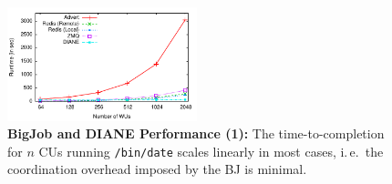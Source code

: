 \documentclass[conference,final]{IEEEtran}
\makeatletter
\def\reduwave{\bgroup \markoverwith{\lower3.5\p@\hbox{\sixly \textcolor{red}{\char58}}}\ULon}
\newcommand{\jwave}[1]{ {\reduwave{#1}}}
\newcommand{\jhanote}[1]{ {\textcolor{red} { ***shantenu: #1 }}}
\newcommand{\alnote}[1]{ {\textcolor{blue} { ***andrel: #1 }}}
\newcommand{\jwave}[1]{#1}
\newcommand{\alnote}[1]{}
\newcommand{\jhanote}[1]{}
\newcommand{\cu}{CU\xspace}
\newcommand{\cus}{CUs\xspace}
\newcommand{\upp}{\vspace*{-0.5em}}
\makeatother
\begin{document}






\begin{figure}[htbp] \centering
\includegraphics[width=0.49\textwidth]{perf/bigjob-varying-wus-alamo.pdf}
\caption{\textbf{BigJob and DIANE Performance (1):} The 
time-to-completion for $n$ \cus running \texttt{/bin/date} scales linearly
in most cases, i.\,e.\ the coordination overhead imposed by the BJ is 
minimal.\upp\upp}
\label{fig:perf_bigjob-varying-wus} \end{figure}
\end{document}
